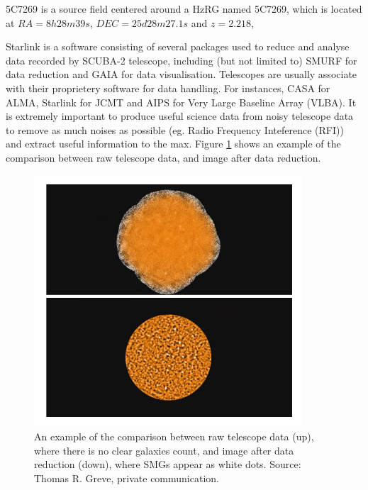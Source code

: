 \documentclass{article}
\begin{document}

\noindent 5C7269 is a source field centered around a HzRG named 5C7269, which is located at $RA = 8h28m39s$, $DEC = 25d28m27.1s$ and $z = 2.218$, 
\medskip

\noindent Starlink is a software consisting of several packages used to reduce and analyse data recorded by SCUBA-2 telescope, including (but not limited to) SMURF for data reduction and GAIA for data visualisation. Telescopes are usually associate with their proprietery software for data handling. For instances, CASA for ALMA, Starlink for JCMT and AIPS for Very Large Baseline Array (VLBA). It is extremely important to produce useful science data from noisy telescope data to remove as much noises as possible (eg. Radio Frequency Inteference (RFI)) and extract useful information to the max. Figure \ref{fig:reducevsunreduce} shows an example of the comparison between raw telescope data, and image after data reduction.

\begin{figure}
    \centering
    \includegraphics[width=100mm]{reducevsunreduce.png}
    \caption{An example of the comparison between raw telescope data (up), where there is no clear galaxies count, and image after data reduction (down), where SMGs appear as white dots. Source: Thomas R. Greve, private communication.}
    \label{fig:reducevsunreduce}
\end{figure}
\end{document}
